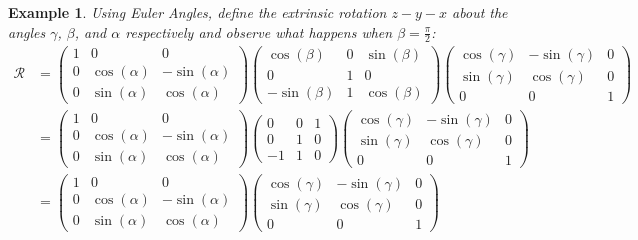 \documentclass[12pt, letterpaper, onecolumn, conference, final]{IEEEtran}
\theoremstyle{definition}
\theoremstyle{plain}
\newtheorem{example}{Example}
\begin{document}
\begin{example}
Using Euler Angles, define the extrinsic rotation $z-y-x$ about the angles $\gamma$, $\beta$, and $\alpha$ respectively and observe what happens when $\beta = \frac{\pi}{2}$:
\begin{equation*}
\begin{split}
\mathcal{R} &= \begin{pmatrix}
1 & 0 & 0 \\
0 & \cos(\alpha) & -\sin(\alpha) \\
0 & \sin(\alpha) & \cos(\alpha)
\end{pmatrix} \begin{pmatrix}
\cos(\beta) & 0 & \sin(\beta) \\
0 & 1 & 0 \\
-\sin(\beta) & 1 & \cos(\beta)
\end{pmatrix} \begin{pmatrix}
\cos(\gamma) & -\sin(\gamma) & 0 \\
\sin(\gamma) & \cos(\gamma) & 0 \\
0 & 0 & 1
\end{pmatrix} \\
&= \begin{pmatrix}
1 & 0 & 0 \\
0 & \cos(\alpha) & -\sin(\alpha) \\
0 & \sin(\alpha) & \cos(\alpha)
\end{pmatrix} \begin{pmatrix}
0 & 0 & 1 \\
0 & 1 & 0 \\
-1 & 1 & 0
\end{pmatrix} \begin{pmatrix}
\cos(\gamma) & -\sin(\gamma) & 0 \\
\sin(\gamma) & \cos(\gamma) & 0 \\
0 & 0 & 1
\end{pmatrix} \\
&= \begin{pmatrix}
1 & 0 & 0 \\
0 & \cos(\alpha) & -\sin(\alpha) \\
0 & \sin(\alpha) & \cos(\alpha)
\end{pmatrix} \begin{pmatrix}
\cos(\gamma) & -\sin(\gamma) & 0 \\
\sin(\gamma) & \cos(\gamma) & 0 \\
0 & 0 & 1
\end{pmatrix} \\

\end{split}
\end{equation*}
\end{example}
\end{document}
